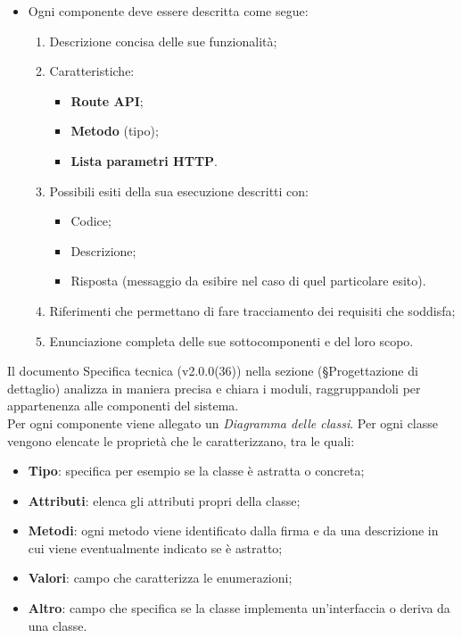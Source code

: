 \documentclass[10pt, a4paper]{article}
\begin{document}
\begin{itemize}
    \item Ogni componente deve essere descritta come segue:
    \begin{enumerate}
        \item Descrizione concisa delle sue funzionalità;
        \item Caratteristiche:
        \begin{itemize}
            \item \textbf{Route API};
            \item \textbf{Metodo} (tipo);
            \item \textbf{Lista parametri HTTP}.
        \end{itemize}
        \item Possibili esiti della sua esecuzione descritti con:
        \begin{itemize}
            \item Codice;
            \item Descrizione;
            \item Risposta (messaggio da esibire nel caso di quel particolare esito). 
        \end{itemize}
        \item Riferimenti che permettano di fare tracciamento dei requisiti che soddisfa;
        \item Enunciazione completa delle sue sottocomponenti e del loro scopo.
    \end{enumerate} 
\end{itemize}
Il documento Specifica tecnica (v2.0.0(36)) nella sezione (\S Progettazione di dettaglio) analizza in maniera precisa e chiara i moduli, raggruppandoli per appartenenza alle componenti del sistema.\\
Per ogni componente viene allegato un \textit{Diagramma delle classi}.
Per ogni classe vengono elencate le proprietà che le caratterizzano, tra le quali:
\begin{itemize}
    \item \textbf{Tipo}: specifica per esempio se la classe è astratta o concreta;
    \item \textbf{Attributi}: elenca gli attributi propri della classe;
    \item \textbf{Metodi}: ogni metodo viene identificato dalla firma e da una descrizione in cui viene eventualmente indicato se è astratto;
    \item \textbf{Valori}: campo che caratterizza le enumerazioni;
    \item \textbf{Altro}: campo che specifica se la classe implementa un'interfaccia o deriva da una classe.
\end{itemize}
\end{document}
